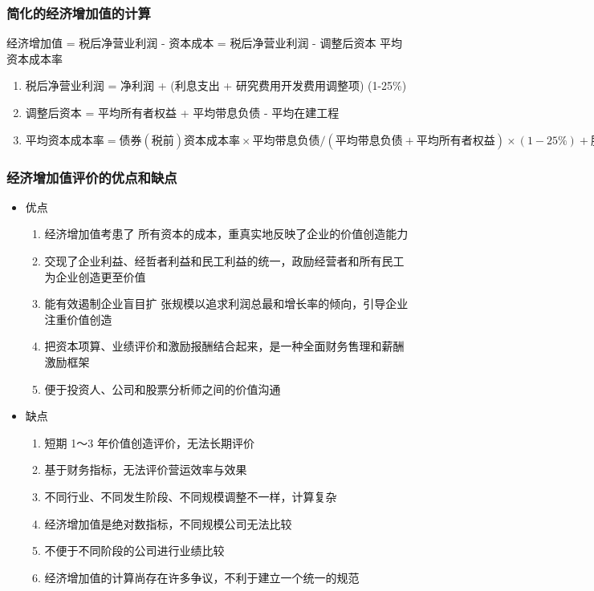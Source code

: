\documentclass[11pt]{article}
\begin{document}
\subsubsection{简化的经济增加值的计算}
\label{sec:org2f19b38}
经济增加值 = 税后净营业利润 - 资本成本 = 税后净营业利润 - 调整后资本 \texttimes{} 平均资本成本率
\begin{enumerate}
\item 税后净营业利润 = 净利润 + (利息支出 + 研究费用开发费用调整项) \texttimes{} (1-25\%)
\item 调整后资本 = 平均所有者权益 + 平均带息负债 - 平均在建工程
\item \(平均资本成本率 = 债券(税前)资本成本率 \times 平均带息负债/(平均带息负债 + 平均所有者权益) \times (1-25\%) + 股权资本成本率 \times 平均所有者权益/(平均带息负债 + 平均所有者权益)\)
\end{enumerate}
\subsubsection{经济增加值评价的优点和缺点}
\label{sec:orgfb4c4ab}
\begin{itemize}
\item 优点
\begin{enumerate}
\item 经济增加值考患了 所有资本的成本，重真实地反映了企业的价值创造能力
\item 交现了企业利益、经哲者利益和民工利益的统一，政励经营者和所有民工为企业创造更至价值
\item 能有效遏制企业盲目扩 张规模以追求利润总最和增长率的倾向，引导企业注重价值创造
\item 把资本项算、业绩评价和激励报酬结合起来，是一种全面财务售理和薪酬激励框架
\item 便于投资人、公司和股票分析师之间的价值沟通
\end{enumerate}
\item 缺点
\begin{enumerate}
\item 短期 1～3 年价值创造评价，无法长期评价
\item 基于财务指标，无法评价营运效率与效果
\item 不同行业、不同发生阶段、不同规模调整不一样，计算复杂
\item 经济增加值是绝对数指标，不同规模公司无法比较
\item 不便于不同阶段的公司进行业绩比较
\item 经济增加值的计算尚存在许多争议，不利于建立一个统一的规范
\end{enumerate}
\end{itemize}
\end{document}
